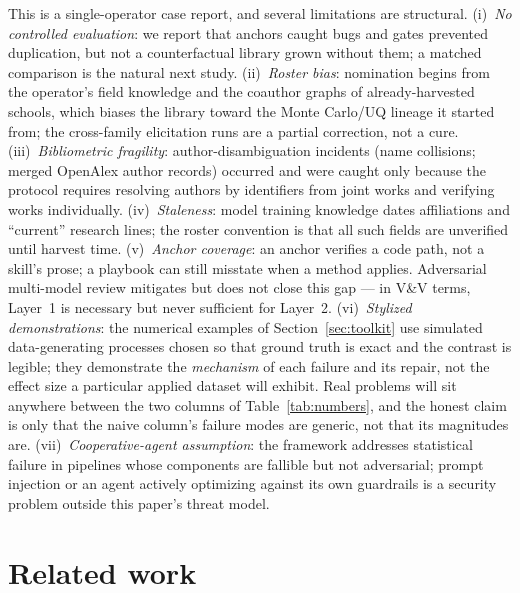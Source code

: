 \documentclass[11pt,a4paper]{article}
\begin{document}
This is a single-operator case report, and several limitations are
structural. (i)~\emph{No controlled evaluation}: we report that anchors
caught bugs and gates prevented duplication, but not a counterfactual
library grown without them; a matched comparison is the natural next
study. (ii)~\emph{Roster bias}: nomination begins from the operator's field
knowledge and the coauthor graphs of already-harvested schools, which
biases the library toward the Monte Carlo/UQ lineage it started from; the
cross-family elicitation runs are a partial correction, not a cure.
(iii)~\emph{Bibliometric fragility}: author-disambiguation incidents (name
collisions; merged OpenAlex author records) occurred and were caught only
because the protocol requires resolving authors by identifiers from joint
works and verifying works individually. (iv)~\emph{Staleness}: model
training knowledge dates affiliations and ``current'' research lines; the
roster convention is that all such fields are unverified until harvest
time. (v)~\emph{Anchor coverage}: an anchor verifies a code path, not a
skill's prose; a playbook can still misstate when a method applies.
Adversarial multi-model review mitigates but does not close this gap ---
in V\&V terms, Layer~1 is necessary but never sufficient for Layer~2.
(vi)~\emph{Stylized demonstrations}: the numerical examples of
Section~\ref{sec:toolkit} use simulated data-generating processes chosen
so that ground truth is exact and the contrast is legible; they demonstrate
the \emph{mechanism} of each failure and its repair, not the effect size a
particular applied dataset will exhibit. Real problems will sit anywhere
between the two columns of Table~\ref{tab:numbers}, and the honest claim is
only that the naive column's failure modes are generic, not that its
magnitudes are. (vii)~\emph{Cooperative-agent assumption}: the framework
addresses statistical failure in pipelines whose components are fallible
but not adversarial; prompt injection or an agent actively optimizing
against its own guardrails is a security problem outside this paper's
threat model.

\section{Related work}\label{sec:related}
\end{document}
